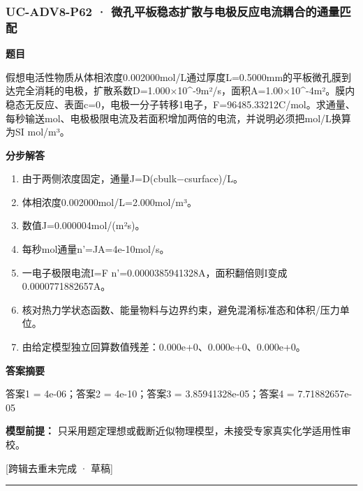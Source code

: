 \documentclass[UTF8,11pt,a4paper]{ctexart}
\begin{document}
\subsubsection*{UC-ADV8-P62 · 微孔平板稳态扩散与电极反应电流耦合的通量匹配}
\noindent\textbf{题目}\par
假想电活性物质从体相浓度0.002000mol/L通过厚度L=0.5000mm的平板微孔膜到达完全消耗的电极，扩散系数D=1.000×10\textasciicircum{}-9m²/s，面积A=1.00×10\textasciicircum{}-4m²。膜内稳态无反应、表面c=0，电极一分子转移1电子，F=96485.33212C/mol。求通量、每秒输送mol、电极极限电流及若面积增加两倍的电流，并说明必须把mol/L换算为SI mol/m³。\par
\medskip\noindent\textbf{分步解答}
\begin{enumerate}
\item 由于两侧浓度固定，通量J=D(cbulk−csurface)/L。
\item 体相浓度0.002000mol/L=2.000mol/m³。
\item 数值J=0.000004mol/(m²s)。
\item 每秒mol通量n'=JA=4e-10mol/s。
\item 一电子极限电流I=F n'=0.0000385941328A，面积翻倍则I变成0.0000771882657A。
\item 核对热力学状态函数、能量物料与边界约束，避免混淆标准态和体积/压力单位。
\item 由给定模型独立回算数值残差：0.000e+0、0.000e+0、0.000e+0。
\end{enumerate}
\noindent\textbf{答案摘要}\par
答案1 = 4e-06；答案2 = 4e-10；答案3 = 3.85941328e-05；答案4 = 7.71882657e-05\par
\noindent\textbf{模型前提：}
只采用题定理想或截断近似物理模型，未接受专家真实化学适用性审校。\par
\noindent\textcolor{red!65!black}{[跨辑去重未完成 · 草稿]} \par
\medskip\hrule\medskip
{}
\end{document}
